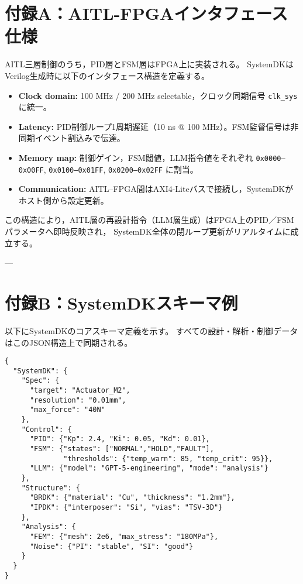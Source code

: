 \appendix
\section*{付録A：AITL-FPGAインタフェース仕様}

AITL三層制御のうち，PID層とFSM層はFPGA上に実装される。
SystemDKはVerilog生成時に以下のインタフェース構造を定義する。

\begin{itemize}
  \item \textbf{Clock domain:} 100 MHz / 200 MHz selectable，クロック同期信号 \texttt{clk\_sys} に統一。
  \item \textbf{Latency:} PID制御ループ1周期遅延（10 ns @ 100 MHz）。FSM監督信号は非同期イベント割込みで伝達。
  \item \textbf{Memory map:} 制御ゲイン，FSM閾値，LLM指令値をそれぞれ \texttt{0x0000–0x00FF}, \texttt{0x0100–0x01FF}, \texttt{0x0200–0x02FF} に割当。
  \item \textbf{Communication:} AITL–FPGA間はAXI4-Liteバスで接続し，SystemDKがホスト側から設定更新。
\end{itemize}

この構造により，AITL層の再設計指令（LLM層生成）はFPGA上のPID／FSMパラメータへ即時反映され，
SystemDK全体の閉ループ更新がリアルタイムに成立する。

---

\section*{付録B：SystemDKスキーマ例}

以下にSystemDKのコアスキーマ定義を示す。
すべての設計・解析・制御データはこのJSON構造上で同期される。

\begin{verbatim}
{
  "SystemDK": {
    "Spec": {
      "target": "Actuator_M2",
      "resolution": "0.01mm",
      "max_force": "40N"
    },
    "Control": {
      "PID": {"Kp": 2.4, "Ki": 0.05, "Kd": 0.01},
      "FSM": {"states": ["NORMAL","HOLD","FAULT"],
              "thresholds": {"temp_warn": 85, "temp_crit": 95}},
      "LLM": {"model": "GPT-5-engineering", "mode": "analysis"}
    },
    "Structure": {
      "BRDK": {"material": "Cu", "thickness": "1.2mm"},
      "IPDK": {"interposer": "Si", "vias": "TSV-3D"}
    },
    "Analysis": {
      "FEM": {"mesh": 2e6, "max_stress": "180MPa"},
      "Noise": {"PI": "stable", "SI": "good"}
    }
  }
}
\end{verbatim}

